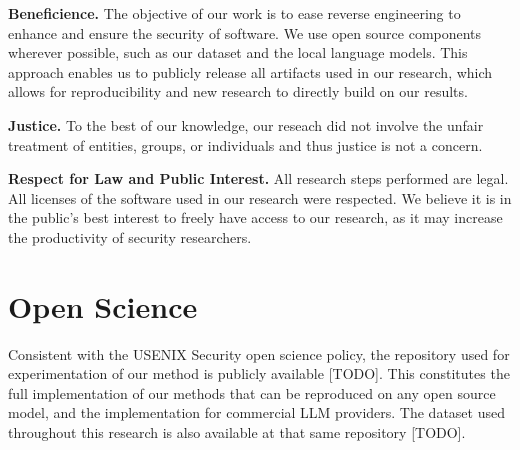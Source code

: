 \noindent \textbf{Beneficience.} The objective of our work is to ease reverse engineering to enhance and ensure the security of software. We
use open source components wherever possible, such as our dataset and the local language models. This approach enables us to publicly release
all artifacts used in our research, which allows for reproducibility and new research to directly build on our results.

\noindent \textbf{Justice.} To the best of our knowledge, our reseach did not involve the unfair treatment of entities, groups, or individuals
and thus justice is not a concern.

\noindent \textbf{Respect for Law and Public Interest.} All research steps performed are legal. All licenses of the software used in our research were
respected. We believe it is in the public's best interest to freely have access to our research, as it may increase the productivity of security researchers.

\section*{Open Science}

Consistent with the USENIX Security open science policy, the repository used for experimentation
of our method is publicly available [TODO]. This constitutes the full implementation of our methods that can be reproduced on
any open source model, and the implementation for commercial LLM providers. The dataset used throughout this research
is also available at that same repository [TODO].








